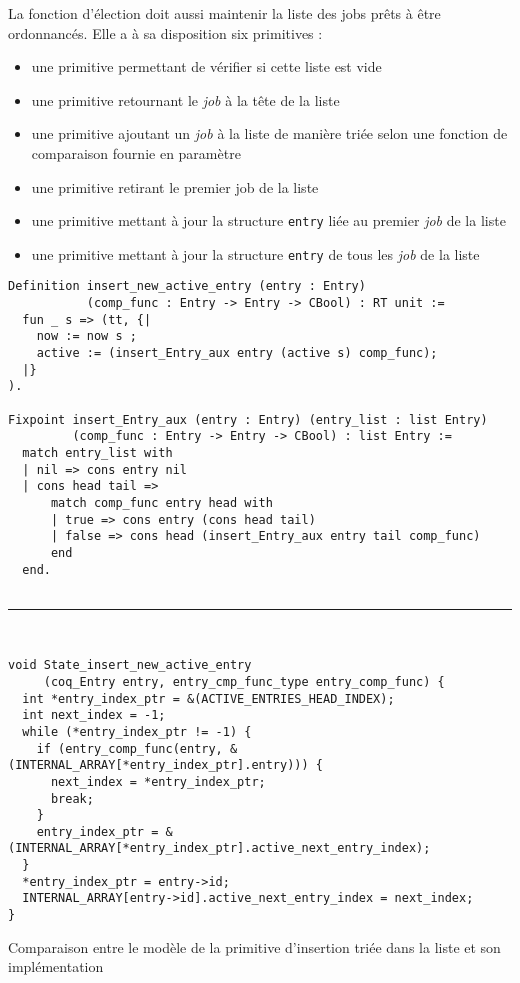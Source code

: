 	La fonction d'élection doit aussi maintenir la liste des jobs prêts à être ordonnancés. Elle a à sa disposition six primitives :
	\begin{itemize}
		\item une primitive permettant de vérifier si cette liste est vide
		\item une primitive retournant le \emph{job} à la tête de la liste
		\item une primitive ajoutant un \emph{job} à la liste de manière triée selon une fonction de comparaison fournie en paramètre
		\item une primitive retirant le premier job de la liste
		\item une primitive mettant à jour la structure \texttt{entry} liée au premier \emph{job} de la liste
		\item une primitive mettant à jour la structure \texttt{entry} de tous les \emph{job} de la liste
	\end{itemize}

	\begin{listing}[!ht]
	    \centering
	    \begin{verbatim}
Definition insert_new_active_entry (entry : Entry)
           (comp_func : Entry -> Entry -> CBool) : RT unit :=
  fun _ s => (tt, {|
    now := now s ;
    active := (insert_Entry_aux entry (active s) comp_func);
  |}
).

Fixpoint insert_Entry_aux (entry : Entry) (entry_list : list Entry)
         (comp_func : Entry -> Entry -> CBool) : list Entry :=
  match entry_list with
  | nil => cons entry nil
  | cons head tail =>
      match comp_func entry head with
      | true => cons entry (cons head tail)
      | false => cons head (insert_Entry_aux entry tail comp_func)
      end
  end.


	    \end{verbatim}
	    \hrule
	    \begin{verbatim}


void State_insert_new_active_entry
     (coq_Entry entry, entry_cmp_func_type entry_comp_func) {
  int *entry_index_ptr = &(ACTIVE_ENTRIES_HEAD_INDEX);
  int next_index = -1;
  while (*entry_index_ptr != -1) {
    if (entry_comp_func(entry, &(INTERNAL_ARRAY[*entry_index_ptr].entry))) {
      next_index = *entry_index_ptr;
      break;
    }
    entry_index_ptr = &(INTERNAL_ARRAY[*entry_index_ptr].active_next_entry_index);
  }
  *entry_index_ptr = entry->id;
  INTERNAL_ARRAY[entry->id].active_next_entry_index = next_index;
}
	    \end{verbatim}
	    \caption{Comparaison entre le modèle de la primitive d'insertion triée dans la liste et son implémentation}
	    \label{code:model_impl_cmp}
	\end{listing}

